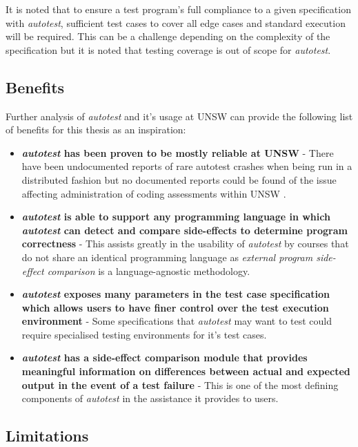 \documentclass[hidelinks]{report}
\begin{document}
It is noted that to ensure a test program's full compliance to a given specification with \textit{autotest}, sufficient test cases to cover all edge cases and standard execution will be required. This can be a challenge depending on the complexity of the specification but it is noted that testing coverage is out of scope for \textit{autotest}.

\subsection{Benefits}

Further analysis of \textit{autotest} and it's usage at UNSW can provide the following list of benefits for this thesis as an inspiration:
\begin{itemize}
	\item \textbf{\textit{autotest} has been proven to be mostly reliable at UNSW} - There have been undocumented reports of rare autotest crashes when being run in a distributed fashion but no documented reports could be found of the issue affecting administration of coding assessments within UNSW \cite{AutotestConversation}.
	\item \textbf{\textit{autotest} is able to support any programming language in which \textit{autotest} can detect and compare side-effects to determine program correctness} - This assists greatly in the usability of \textit{autotest} by courses that do not share an identical programming language as \textit{external program side-effect comparison} is a language-agnostic methodology.
	\item \textbf{\textit{autotest} exposes many parameters in the test case specification which allows users to have finer control over the test execution environment} - Some specifications that \textit{autotest} may want to test could require specialised testing environments for it's test cases.
	\item \textbf{\textit{autotest} has a side-effect comparison module that provides meaningful information on differences between actual and expected output in the event of a test failure} - This is one of the most defining components of \textit{autotest} in the assistance it provides to users.
\end{itemize} 

\subsection{Limitations}
\end{document}

